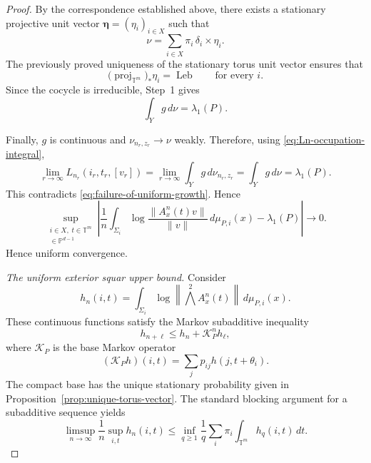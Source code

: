\documentclass[11pt,a4paper]{amsart}
\newcommand{\T}{\mathbb T}
\newcommand{\PP}{\mathbb P}
\newcommand{\Leb}{\operatorname{Leb}}
\newcommand{\norm}[1]{\left\lVert #1\right\rVert}
\begin{document}
\begin{proof}
By the correspondence established above, there exists a
stationary projective unit vector
\(\boldsymbol\eta=(\eta_i)_{i\in X}\) such that
\[
 \nu
 =
 \sum_{i\in X}\pi_i\,\delta_i\times\eta_i.
\]
The previously proved uniqueness of the stationary torus unit vector
ensures that
\[
 \bigl(\operatorname{proj}_{\T^m}\bigr)_*\eta_i
 =
 \Leb
 \qquad\text{for every }i.
\]
Since the cocycle is irreducible, Step~1 gives
\[
 \int_Yg\,d\nu
 =
 \lambda_1(P).
\]

Finally, \(g\) is continuous and
\(\nu_{n_r,z_r}\to\nu\) weakly.  Therefore,
using \eqref{eq:Ln-occupation-integral},
$$
 \lim_{r\to\infty}
 L_{n_r}(i_r,t_r,[v_r])
 =
 \lim_{r\to\infty}
 \int_Yg\,d\nu_{n_r,z_r} = 
 \int_Yg\,d\nu =  \lambda_1(P).
$$
This contradicts
\eqref{eq:failure-of-uniform-growth}.  Hence
\[
 \sup_{\substack{i\in X,\;t\in\T^m\\
                 [v]\in\PP^{d-1}}}
 \left|
 \frac1n
 \int_{\Sigma_i}
 \log\frac{\|A_x^n(t)v\|}{\|v\|}
 \,d\mu_{P,i}(x)
 -
 \lambda_1(P)
 \right|
 \longrightarrow0.
\]
Hence uniform convergence.

\noindent\emph{The uniform exterior squar upper bound.}
Consider
\[
 h_n(i,t)=
 \int_{\Sigma_i}
 \log\norm{{\textstyle\bigwedge^2}A_x^n(t)}
 \,d\mu_{P,i}(x).
\]
These continuous functions satisfy the Markov subadditive inequality
\[
 h_{n+\ell}\le h_n+\mathcal K_P^nh_\ell,
\]
where \(\mathcal K_P\) is the base Markov operator
\[
 (\mathcal K_Ph)(i,t)
 =\sum_jp_{ij}h(j,t+\theta_i).
\]
The compact base
has the unique stationary probability given in
Proposition~\ref{prop:unique-torus-vector}.  The standard blocking
argument for a subadditive sequence yields
\[
 \limsup_{n\to\infty}\frac1n\sup_{i,t}h_n(i,t)
 \le
 \inf_{q\ge1}\frac1q
 \sum_i\pi_i\int_{\T^m}h_q(i,t)\,dt.
\]


\end{proof}
\end{document}
